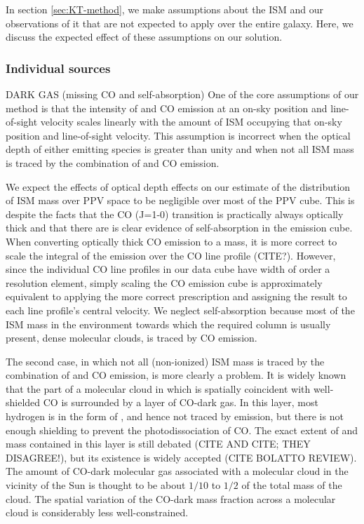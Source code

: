 In section \ref{sec:KT-method}, we make assumptions about the ISM and our observations of it that are not expected to apply over the entire galaxy. Here, we discuss the expected effect of these assumptions on our solution.
\subsubsection{Individual sources}
DARK GAS (missing CO and \atomH self-absorption)
One of the core assumptions of our method is that the intensity of \atomH and CO emission at an on-sky position and line-of-sight velocity scales linearly with the amount of ISM occupying that on-sky position and line-of-sight velocity. This assumption is incorrect when the optical depth of either emitting species is greater than unity and when not all ISM mass is traced by the combination of \atomH and CO emission. 

We expect the effects of optical depth effects on our estimate of the distribution of ISM mass over PPV space to be negligible over most of the PPV cube. This is despite the facts that the CO (J=1-0) transition is practically always optically thick and that there are is clear evidence of \atomH self-absorption in the \atomH emission cube. When converting optically thick CO emission to a \molH mass, it is more correct to scale the integral of the emission over the CO line profile (CITE?). However, since the individual CO line profiles in our data cube have width of order a resolution element, simply scaling the CO emission cube is approximately equivalent to applying the more correct prescription and assigning the result to each line profile's central velocity. We neglect \atomH self-absorption because most of the ISM mass in the environment towards which the required \atomH column is usually present, dense molecular clouds, is traced by CO emission. 

The second case, in which not all (non-ionized) ISM mass is traced by the combination of \atomH and CO emission, is more clearly a problem. It is widely known that the part of a molecular cloud in which \molH is spatially coincident with well-shielded CO is surrounded by a layer of CO-dark gas. In this layer, most hydrogen is in the form of \molH, and hence not traced by \atomH emission, but there is not enough shielding to prevent the photodissociation of CO. The exact extent of and mass contained in this layer is still debated (CITE AND CITE; THEY DISAGREE!), but its existence is widely accepted (CITE BOLATTO REVIEW). The amount of CO-dark molecular gas associated with a molecular cloud in the vicinity of the Sun is thought to be about $1/10$ to $1/2$ of the total mass of the cloud. The spatial variation of the CO-dark mass fraction across a molecular cloud is considerably less well-constrained.


